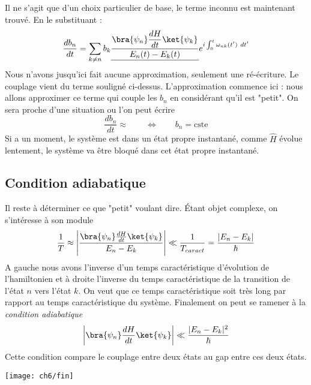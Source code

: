 Il ne s'agit que d'un choix particulier de base, le terme inconnu est maintenant trouvé. En le 
substituant :
\begin{equation}
\frac{db_n}{dt} = \sum_{k\neq n} b_k \underline{\dfrac{\bra{\psi_n}\dfrac{dH}{dt}\ket{\psi_k}}{E_n(t)-E_k(t)}}
e^{i\int_0^t \omega_{nk}(t')\ dt'}
\end{equation}
Nous n'avons jusqu'ici fait aucune approximation, seulement une ré-écriture. Le couplage 
vient du terme souligné ci-dessus. L'approximation commence ici : nous allons approximer ce 
terme qui couple les $b_n$ en considérant qu'il est "petit". On sera proche d'une situation 
ou l'on peut écrire
\begin{equation}
\dfrac{db_n}{dt}\approx\qquad\Leftrightarrow\qquad b_n = \text{cste}
\end{equation}
Si a un moment, le système est dans un état propre instantané, comme $\hat{H}$ évolue lentement, 
le système va être bloqué dans cet état propre instantané.


	\subsection{Condition adiabatique}
	Il reste à déterminer ce que "petit" voulant dire. Étant objet complexe, on s'intéresse à son module
	\begin{equation}
	\frac{1}{T}\approx\left|\dfrac{\bra{\psi_n}\frac{dH}{dt}\ket{\psi_k}}{E_n-E_k}\right| \ll \dfrac{1}{
	T_{caract}} = \dfrac{|E_n-E_k|}{\hbar}
	\end{equation}
	A gauche nous avons l'inverse d'un temps caractéristique d'évolution de l'hamiltonien et à droite 
	l'inverse du temps caractéristique de la transition de l'état $n$ vers l'état $k$. On veut que ce 
	temps caractéristique soit très long par rapport au temps caractéristique	du système. Finalement 
	on peut se ramener à la \textit{condition adiabatique}
	\begin{equation}
	\left|\bra{\psi_n}\frac{dH}{dt}\ket{\psi_k}\right| \ll \dfrac{|E_n-E_k|^2}{\hbar}
	\end{equation}
	Cette condition compare le couplage entre deux états au gap entre ces deux états.
	
	
	
	
	\vspace{1cm}
	\begin{center}
	\texttt{[image: ch6/fin]}
	\end{center}				